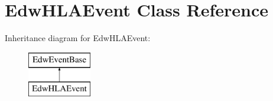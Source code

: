 \hypertarget{class_edw_h_l_a_event}{
\section{EdwHLAEvent Class Reference}
\label{class_edw_h_l_a_event}
}
Inheritance diagram for EdwHLAEvent:\begin{figure}[H]
\begin{center}
\leavevmode
\includegraphics[height=2cm]{class_edw_h_l_a_event}
\end{center}
\end{figure}
